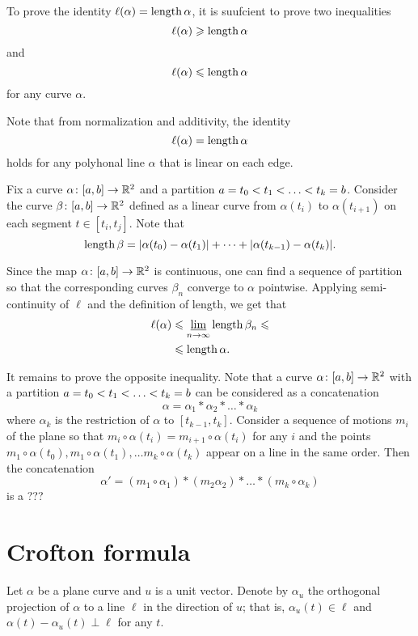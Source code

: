 To prove the identity  $\ell(\alpha)=\mathop{\rm length}\nolimits \alpha$, it is suufcient to prove two inequalities 
\[\ell(\alpha)\geqslant \mathop{\rm length}\nolimits\alpha\]
and 
\[\ell(\alpha)\leqslant \mathop{\rm length}\nolimits\alpha\]
for any curve $\alpha$.

Note that from normalization and additivity, the identity 
\[\ell(\alpha)=\mathop{\rm length}\nolimits \alpha\]
holds for any polyhonal line $\alpha$ that is linear on each edge.

Fix a curve $\alpha\colon[a,b]\to \mathbb{R}^2$ and a partition $a=t_0\z<t_1\z<\z\dots\z<t_k=b$. 
Consider the curve $\beta\colon[a,b]\to \mathbb{R}^2$ defined as a linear curve from $\alpha(t_i)$ to $\alpha(t_{i+1})$  on each segment $t\in[t_i,t_j]$.
Note that 
\[\mathop{\rm length}\nolimits\beta=|\alpha(t_0)-\alpha(t_1)|+\dots+|\alpha(t_{k-1})-\alpha(t_k)|.\]

Since the map  $\alpha\colon[a,b]\to \mathbb{R}^2$ is continuous,
one can find a sequence of partition so that the corresponding curves $\beta_n$ converge to $\alpha$ pointwise.
Applying semi-continuity of $\ell$ and the definition of length, we get that 
\begin{align*}
\ell(\alpha)&\leqslant \varliminf_{n\to\infty}\mathop{\rm length}\nolimits\beta_n\leqslant
\\
&\leqslant\mathop{\rm length}\nolimits \alpha.
\end{align*}

It remains to prove the opposite inequality.
Note that a curve $\alpha\colon[a,b]\to \mathbb{R}^2$ with a partition $a=t_0\z<t_1\z<\z\dots\z<t_k=b$ can be considered as a concatenation
\[\alpha=\alpha_1*\alpha_2*\dots*\alpha_k\]
where $\alpha_k$ is the restriction of $\alpha$ to $[t_{k-1},t_k]$.
Consider a sequence of motions $m_i$ of the plane so that $m_i\circ\alpha(t_i)=m_{i+1}\circ\alpha(t_i)$ for any $i$ and 
the points $m_1\circ\alpha(t_0), m_1\circ\alpha(t_1),\dots m_k\circ\alpha(t_k)$ appear on a line in the same order.
Then the concatenation 
\[\alpha'=(m_1\circ\alpha_1)*(m_2\alpha_2)*\dots*(m_k\circ\alpha_k)\]
is a ???





\qeds




\section{Crofton formula}

Let $\alpha$ be a plane curve and $u$ is a unit vector.
Denote by $\alpha_u$ the orthogonal projection of $\alpha$ to a line $\ell$ in the direction of $u$;
that is, $\alpha_u(t)\in\ell$ and $\alpha(t)-\alpha_u(t)\perp \ell$ for any $t$.

